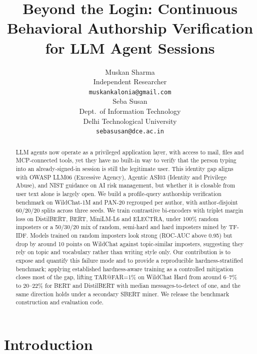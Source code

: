 \documentclass[11pt]{article}
\title{Beyond the Login: Continuous Behavioral Authorship Verification for LLM Agent Sessions}
\author{Muskan Sharma \\
  Independent Researcher \\
  \texttt{muskankalonia@gmail.com} \\\And
  Seba Susan \\
  Dept.\ of Information Technology \\
  Delhi Technological University \\
  \texttt{sebasusan@dce.ac.in} \\}
\begin{document}
\maketitle
\begin{abstract}
LLM agents now operate as a privileged application layer, with access to mail, files and MCP-connected tools, yet they have no built-in way to verify that the person typing into an already-signed-in session is still the legitimate user. This identity gap aligns with OWASP LLM06 (Excessive Agency), Agentic ASI03 (Identity and Privilege Abuse), and NIST guidance on AI risk management, but whether it is closable from user text alone is largely open. We build a profile-query authorship verification benchmark on WildChat-1M and PAN-20 regrouped per author, with author-disjoint 60/20/20 splits across three seeds. We train contrastive bi-encoders with triplet margin loss on DistilBERT, BERT, MiniLM-L6 and ELECTRA, under 100\% random imposters or a 50/30/20 mix of random, semi-hard and hard imposters mined by TF-IDF. Models trained on random imposters look strong (ROC-AUC above 0.95) but drop by around 10 points on WildChat against topic-similar imposters, suggesting they rely on topic and vocabulary rather than writing style only. Our contribution is to expose and quantify this failure mode and to provide a reproducible hardness-stratified benchmark; applying established hardness-aware training as a controlled mitigation closes most of the gap, lifting TAR@FAR=1\% on WildChat Hard from around 6--7\% to 20--22\% for BERT and DistilBERT with median messages-to-detect of one, and the same direction holds under a secondary SBERT miner. We release the benchmark construction and evaluation code.
\end{abstract}

\section{Introduction}
\label{sec:intro}
\end{document}

